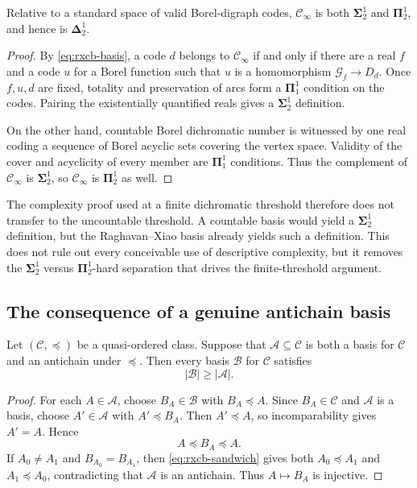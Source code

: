 \begin{corollary}
\label{cor:rxcb-high-delta12}
Relative to a standard space of valid Borel-digraph codes,
$\mathcal C_\infty$ is both $\boldsymbol\Sigma^1_2$ and
$\boldsymbol\Pi^1_2$, and hence is $\boldsymbol\Delta^1_2$.
\end{corollary}

\begin{proof}
By \eqref{eq:rxcb-basis}, a code $d$ belongs to
$\mathcal C_\infty$ if and only if there are a real $f$ and a code $u$
for a Borel function such that $u$ is a homomorphism
$\mathcal G_f\to D_d$.  Once $f,u,d$ are fixed, totality and
preservation of arcs form a $\boldsymbol\Pi^1_1$ condition on the
codes.  Pairing the existentially quantified reals gives a
$\boldsymbol\Sigma^1_2$ definition.

On the other hand, countable Borel dichromatic number is witnessed by
one real coding a sequence of Borel acyclic sets covering the vertex
space.  Validity of the cover and acyclicity of every member are
$\boldsymbol\Pi^1_1$ conditions.  Thus the complement of
$\mathcal C_\infty$ is $\boldsymbol\Sigma^1_2$, so
$\mathcal C_\infty$ is $\boldsymbol\Pi^1_2$ as well.
\end{proof}

The complexity proof used at a finite dichromatic threshold therefore
does not transfer to the uncountable threshold.  A countable basis
would yield a $\boldsymbol\Sigma^1_2$ definition, but the
Raghavan--Xiao basis already yields such a definition.  This does not
rule out every conceivable use of descriptive complexity, but it
removes the $\boldsymbol\Sigma^1_2$ versus
$\boldsymbol\Pi^1_2$-hard separation that drives the finite-threshold
argument.

\subsection{The consequence of a genuine antichain basis}
\label{subsec:rxcb-antichain}

\begin{lemma}
\label{lem:rxcb-antichain-basis}
Let $(\mathcal C,\preceq)$ be a quasi-ordered class.  Suppose that
$\mathcal A\subseteq\mathcal C$ is both a basis for $\mathcal C$ and
an antichain under $\preceq$.  Then every basis $\mathcal B$ for
$\mathcal C$ satisfies
\[
  |\mathcal B|\geq|\mathcal A|.
\]
\end{lemma}

\begin{proof}
For each $A\in\mathcal A$, choose $B_A\in\mathcal B$ with
$B_A\preceq A$.  Since $B_A\in\mathcal C$ and $\mathcal A$ is a
basis, choose $A'\in\mathcal A$ with $A'\preceq B_A$.  Then
$A'\preceq A$, so incomparability gives $A'=A$.  Hence
\begin{equation}
  A\preceq B_A\preceq A.
  \label{eq:rxcb-sandwich}
\end{equation}
If $A_0\neq A_1$ and $B_{A_0}=B_{A_1}$, then
\eqref{eq:rxcb-sandwich} gives both $A_0\preceq A_1$ and
$A_1\preceq A_0$, contradicting that $\mathcal A$ is an antichain.
Thus $A\mapsto B_A$ is injective.
\end{proof}

